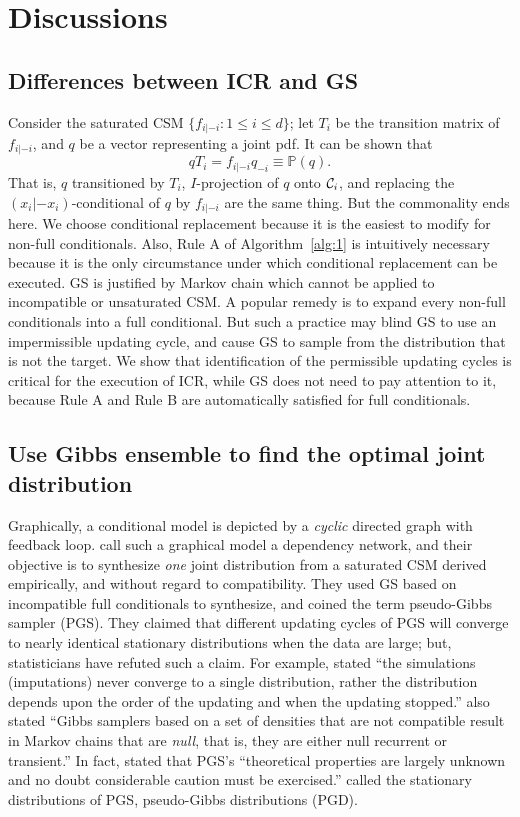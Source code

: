 \documentclass[12pt,a4paper]{article}
\begin{document}
\section{Discussions}\label{sec:4}
\subsection{Differences between ICR and GS}\label{sec:4-1}
Consider the saturated CSM $\{f_{i|-i}: 1 \le i \le d\}$; let $T_i$ be the transition matrix of $f_{i|-i}$, and $q$ be a vector representing a joint pdf.
It can be shown that
\[ qT_i=f_{i|-i} q_{-i} \equiv {\mathbb P}(q). \]
That is, $q$ transitioned by $T_i$, $I$-projection of $q$ onto ${\cal C}_i$, and replacing the $(x_i|-x_i)$-conditional of $q$ by $f_{i|-i}$ are the same thing.  But the commonality ends here.
We choose conditional replacement because it is the easiest to modify for non-full conditionals.
Also, {\sf Rule A} of Algorithm~\ref{alg:1} is intuitively necessary because it is the only circumstance under which conditional replacement can be executed.
GS is justified by Markov chain which cannot be applied to incompatible or unsaturated CSM.
A popular remedy is to expand   every non-full conditionals into  a full conditional.
But such a practice may blind GS to use an impermissible updating  cycle, and cause GS to sample from  the  distribution that is not the target.
We show that  identification of the permissible updating cycles is critical for the execution of ICR, while
GS does not need to pay  attention to it, because {\sf Rule A} and {\sf Rule B} are automatically satisfied for full conditionals.

\subsection{Use Gibbs ensemble to find the optimal joint distribution}\label{sec:4-2}
Graphically, a conditional model is depicted by a \emph{cyclic} directed graph with feedback loop.
\citet{Heckerman2000} call such a graphical model a dependency network, and their
objective is to synthesize \emph{one} joint distribution from a saturated CSM derived empirically, and without regard to compatibility.  They used GS based on incompatible full conditionals to synthesize,  and coined the term pseudo-Gibbs sampler (PGS).  They claimed that different updating  cycles of PGS will converge to  nearly identical stationary distributions when the data are large; but, statisticians have refuted such a claim.
For example, \citet[p.~268]{Gelman2001} stated ``the simulations (imputations) never converge to a single
distribution, rather the distribution depends upon the order of the updating and when the updating stopped.''   \citet[p.~257]{Casella1996} also stated ``Gibbs samplers based on a set of densities that are not compatible result in Markov chains that are \emph{null}, that is, they are either null recurrent or transient.''
In fact, \citet[p.~267]{Besag2001} stated that PGS's
``theoretical properties are largely unknown and no doubt considerable caution must be exercised.''
\citet{Heckerman2000} called the stationary distributions of PGS, pseudo-Gibbs distributions (PGD).
\end{document}
